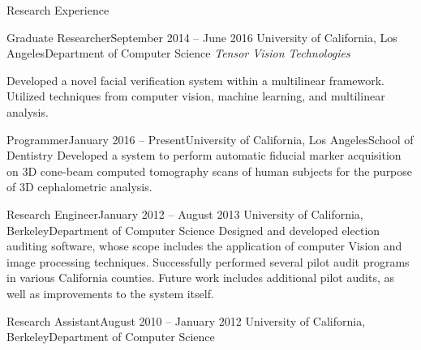 \documentclass{resume}
\begin{document}
\vspace{0.5em}

\begin{component}{Research Experience}
    \begin{position}{Graduate Researcher}{September 2014 -- June 2016}
        {University of California, Los Angeles}{Department of Computer Science}
    \emph{Tensor Vision Technologies}

    {Developed a novel facial verification system within a multilinear framework. Utilized techniques from computer vision, machine learning, and multilinear analysis.}
    \end{position}

    \begin{position}{Programmer}{January 2016 -- Present}{University of California, Los Angeles}{School of Dentistry}
      Developed a system to perform automatic fiducial marker acquisition on 3D cone-beam computed tomography scans of human subjects for the purpose of 3D cephalometric analysis.
      \end{position}

    \begin{position}{Research Engineer}{January 2012 -- August 2013}
        {University of California, Berkeley}{Department of Computer Science}
    {Designed and developed election auditing software, whose scope includes the application of computer Vision and image processing techniques. Successfully performed several pilot audit programs in various California counties. Future work includes additional pilot audits, as well as improvements to the system itself.}
    \end{position}
    
    \begin{position}{Research Assistant}{August 2010 -- January 2012}
        {University of California, Berkeley}{Department of Computer Science}
    {}
    \end{position}
\end{component}

\vspace{-1.5em}
\end{document}
